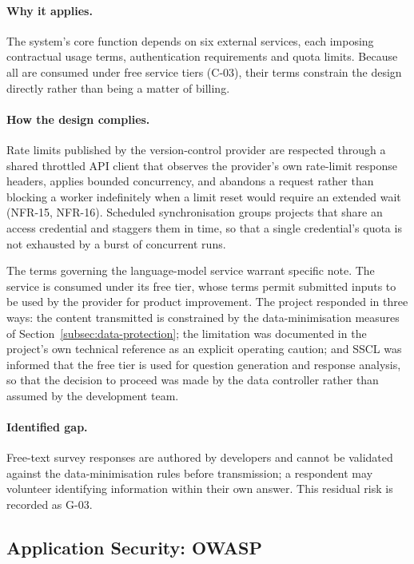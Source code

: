 \paragraph{Why it applies.}
The system's core function depends on six external services, each imposing
contractual usage terms, authentication requirements and quota limits. Because
all are consumed under free service tiers (C-03), their terms constrain the
design directly rather than being a matter of billing.

\paragraph{How the design complies.}
Rate limits published by the version-control provider are respected through a
shared throttled API client that observes the provider's own rate-limit response
headers, applies bounded concurrency, and abandons a request rather than blocking
a worker indefinitely when a limit reset would require an extended wait
(NFR-15, NFR-16). Scheduled synchronisation groups projects that share an access
credential and staggers them in time, so that a single credential's quota is not
exhausted by a burst of concurrent runs.

The terms governing the language-model service warrant specific note. The service
is consumed under its free tier, whose terms permit submitted inputs to be used
by the provider for product improvement. The project responded in three ways:
the content transmitted is constrained by the data-minimisation measures of
Section~\ref{subsec:data-protection}; the limitation was documented in the
project's own technical reference as an explicit operating caution; and
SSCL was informed that the free tier is used for question generation and
response analysis, so that the decision to proceed was made by the data
controller rather than assumed by the development team.

\paragraph{Identified gap.}
Free-text survey responses are authored by developers and cannot be validated
against the data-minimisation rules before transmission; a respondent may
volunteer identifying information within their own answer. This residual risk is
recorded as G-03.

\subsection{Application Security: OWASP}
\label{subsec:owasp}

